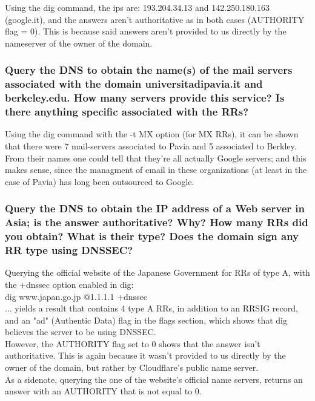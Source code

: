 \documentclass[a4paper,10pt]{article}
\begin{document}
Using the dig command, the ips are: 193.204.34.13 and 142.250.180.163 (google.it), and the answers aren't authoritative as in both cases (AUTHORITY flag = 0). This is because said answers aren't provided to us directly by the nameserver of the owner of the domain.

\subsubsection{Query the DNS to obtain the name(s) of the mail servers associated with the
domain universitadipavia.it and berkeley.edu. How many servers
provide this service? Is there anything specific associated with the RRs?}

Using the dig command with the -t MX option (for MX RRs), it can be shown that there were 7 mail-servers associated to Pavia and 5 associated to Berkley. From their names one could tell that they're all actually Google servers; and this makes sense, since the managment of email in these organizations (at least in the case of Pavia) has long been outsourced to Google.


\subsubsection{Query the DNS to obtain the IP address of a Web server in Asia; is the answer
authoritative? Why? How many RRs did you obtain? What is their type? Does the
domain sign any RR type using DNSSEC?}

Querying the official website of the Japanese Government for RRs of type A, with the +dnssec option enabled in dig:\\

dig www.japan.go.jp @1.1.1.1 +dnssec\\

... yields a result that contains 4 type A RRs, in addition to an RRSIG record, and an "ad" (Authentic Data) flag in the flags section, which shows that dig believes the server to be using DNSSEC. \\

However, the AUTHORITY flag set to 0 shows that the answer isn't authoritative. This is again because it wasn't provided to us directly by the owner of the domain, but rather by Cloudflare's public name server.\\


As a sidenote, querying the one of the website's official name servers, returns an answer with an AUTHORITY that is not equal to 0.\\
\end{document}
